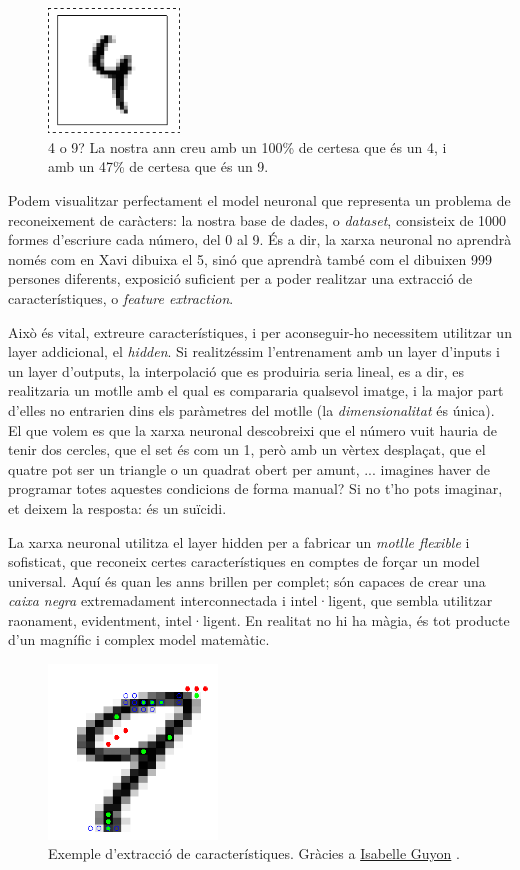 \begin{figure}[ht!]
\centering
\includegraphics[width=35mm]{data/confusing_2.png}
\caption{4 o 9? La nostra \ac{ann} creu amb un 100\% de certesa que és un 4, i amb un 47\% de certesa que és un 9.}
\label{certesa}
\end{figure}

Podem visualitzar perfectament el model neuronal que representa un problema de reconeixement de caràcters: la nostra
base de dades, o \emph{dataset}, consisteix de 1000 formes d'escriure cada número, del 0 al 9. És a dir, la xarxa neuronal
no aprendrà només com en Xavi dibuixa el 5, sinó que aprendrà també com el dibuixen 999 persones diferents, exposició suficient per
a poder realitzar una extracció de característiques, o \emph{feature extraction}.

Això és vital, extreure característiques, i per aconseguir-ho necessitem utilitzar un layer addicional, el \emph{hidden}. 
Si realitzéssim l'entrenament amb un layer d'inputs i un layer d'outputs, la interpolació que es produiria seria lineal,
es a dir, es realitzaria un motlle amb el qual es compararia qualsevol imatge, i la major part d'elles no entrarien dins
els paràmetres del motlle (la \emph{dimensionalitat} és única). El que volem es que la xarxa neuronal descobreixi que el número
vuit hauria de tenir dos cercles, que el set és com un 1, però amb un vèrtex desplaçat, que el quatre pot ser un triangle o un
quadrat obert per amunt, ... imagines haver de programar totes aquestes condicions de forma manual? Si no t'ho pots imaginar, 
et deixem la resposta: és un suïcidi.

La xarxa neuronal utilitza el layer hidden per a fabricar un \emph{motlle flexible} i sofisticat, que reconeix certes característiques
en comptes de forçar un model universal. Aquí és quan les \ac{ann}s brillen per complet; són capaces de crear una \emph{caixa negra}
extremadament interconnectada i intel·ligent, que sembla utilitzar raonament, evidentment, intel·ligent. En realitat no hi ha màgia, 
és tot producte d'un magnífic i complex model matemàtic.

\begin{figure}[ht!]
\centering
\includegraphics[width=45mm]{data/extraction-0.png}
\caption{Exemple d'extracció de característiques. Gràcies a \href{http://clopinet.com/isabelle/Projects/ETH/}{Isabelle Guyon} \autocite{guyonfe}.}
\label{extracció}
\end{figure}

